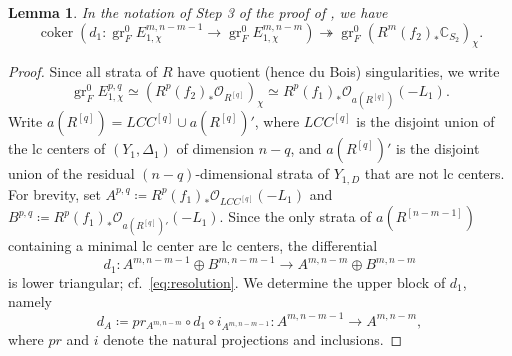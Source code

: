 \documentclass{amsart}
\newcommand{\coker}{\operatorname{coker}}
\newtheorem{lemma}[theorem]{Lemma}
\theoremstyle{definition}
\theoremstyle{remark}
\def\bC{\mathbb{C}}
\def\cO{\mathcal{O}}
\def\gr{\operatorname{gr}}
\numberwithin{equation}{section}
\begin{document}
\begin{lemma}\label{lem:cokerd1} In the notation of Step 3 of the proof of , we have
\[
\coker(d_1 \colon \gr_F^0 E^{m, n-m-1}_{1,\chi} \to \gr_F^0 E^{m,n-m}_{1,\chi}) \twoheadrightarrow \gr_F^0(R^m(f_2)_*\bC_{S_2})_{\chi}.\]
\end{lemma}
\begin{proof}
Since all strata of $R$ have quotient (hence du Bois) singularities, we write
\[\gr_F^0 E^{p,q}_{1,\chi} \simeq (R^{p} (f_{2})_*\cO_{R^{[q]}})_{\chi} \simeq R^{p} (f_{1})_*\cO_{a(R^{[q]})}(-L_1).\] 
Write $a(R^{[q]}) = LCC^{[q]} \cup a(R^{[q]})'$,
where $LCC^{[q]}$ is the disjoint union of the lc centers of $(Y_1, \Delta_1)$ of dimension $n-q$, and $a(R^{[q]})'$ is the disjoint union of the residual $(n-q)$-dimensional strata of $Y_{1, D}$ that are not lc centers.
For brevity, set $A^{p, q} \coloneqq R^{p} (f_{1})_*\cO_{LCC^{[q]}}(-L_1)$ and $B^{p, q} \coloneqq R^{p} (f_{1})_*\cO_{a(R^{[q]})'}(-L_1)$.
Since the only strata of $a(R^{[n-m-1]})$ containing a minimal lc center are lc centers,  the differential
\[d_1 \colon A^{m, n-m-1} \oplus B^{m, n-m-1} \to A^{m, n-m} \oplus B^{m, n-m} 
\] 
is lower triangular; cf.~\eqref{eq:resolution}.
We determine the upper block of $d_1$, namely
\[d_A \coloneqq pr_{A^{m, n-m}} \circ d_1 \circ i_{A^{m, n-m-1}}  \colon 
 A^{m, n-m-1} \to A^{m, n-m},
\]
where $pr$ and $i$ denote the natural projections and inclusions.


\end{proof}
\end{document}
